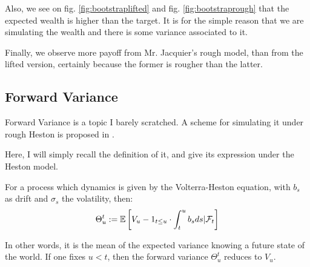 \begin{remarque}
Also, we see on fig. \ref{fig:bootstraplifted} and fig. \ref{fig:bootstraprough} that the expected wealth is higher than the target. It is  for the simple reason that we are simulating the wealth and there is some variance associated to it.
\end{remarque}

\begin{remarque}
Finally, we observe more payoff from Mr. Jacquier's rough model, than from the lifted version, certainly because the former is rougher than the latter.
\end{remarque}


\subsection{Forward Variance }

Forward Variance is a topic I barely scratched. A scheme for simulating it under rough Heston is proposed in \cite{ROUGH_HESTON}.

Here, I will simply recall the definition of it, and give its expression under the Heston model.

\begin{definition}
For a process which dynamics is given by the Volterra-Heston equation, with $b_s$ as drift and $\sigma_s$ the volatility, then:
$$ \Theta_u^t := \mathbb E \left [ V_u  - 1_{ t \leq u } \cdot  \int_t^u b_s ds  | \mathcal F_t  \right ] $$
\end{definition}

In other words, it is the mean of the expected variance knowing a future state of the world. If one fixes $u < t$, then the forward variance $\Theta_u^t$ reduces to $V_u$.











